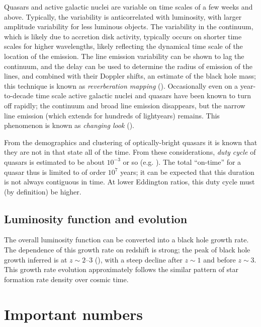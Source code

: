 Quasars and active galactic nuclei are variable on time scales of a
few weeks and above. Typically, the variability is anticorrelated with
luminosity, with larger amplitude variability for less luminous
objects. The variability in the continuum, which is likely due to
accretion disk activity, typically occurs on shorter time scales for
higher wavelengths, likely reflecting the dynamical time scale of the
location of the emission.  The line emission variability can be shown
to lag the continuum, and the delay can be used to determine the
radius of emission of the lines, and combined with their Doppler
shifts, an estimate of the black hole mass; this technique is known as
{\it reverberation mapping} (\citealt{peterson93a}). Occasionally even
on a year-to-decade time scale active galactic nuclei and quasars have
been known to turn off rapidly; the continuum and broad line emission
disappears, but the narrow line emission (which extends for hundreds
of lightyears) remains. This phenomenon is known as {\it changing
look} (\citealt{green22a}).

From the demographics and clustering of optically-bright quasars it is
known that they are not in that state all of the time. From these
considerations, {\it duty cycle} of quasars is estimated to be about
$10^{-3}$ or so (e.g. \citealt{shankar10a}). The total ``on-time'' for
a quasar thus is limited to of order $10^7$ years; it can be expected
that this duration is not always contiguous in time. At lower
Eddington ratios, this duty cycle must (by definition) be higher.

\subsection{Luminosity function and evolution}

The overall luminosity function can be converted into a black hole
growth rate. The dependence of this growth rate on redshift is
strong; the peak of black hole growth inferred is at $z\sim 2$--3
(\citealt{shankar09a}), with a steep decline after $z\sim 1$ and
before $z\sim 3$. This growth rate evolution approximately follows the
similar pattern of star formation rate density over cosmic time.


\section{Important numbers}

